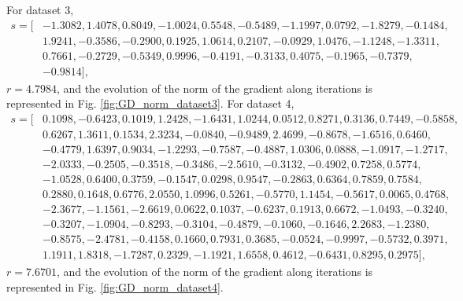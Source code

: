 \documentclass[12pt]{article}
\begin{document}
For dataset 3,
\begin{align*}
    s = [&-1.3082,1.4078,0.8049,-1.0024,0.5548,-0.5489,-1.1997,0.0792,-1.8279,-0.1484,\\
    &1.9241,-0.3586,-0.2900,0.1925,1.0614,0.2107,-0.0929,1.0476,-1.1248,-1.3311,\\
    &0.7661,-0.2729,-0.5349,0.9996,-0.4191,-0.3133,0.4075,-0.1965,-0.7379,\\
    &-0.9814],
\end{align*}
$r = 4.7984$, and the evolution of the norm of the gradient along iterations is represented in Fig. \ref{fig:GD_norm_dataset3}. For dataset 4,
\begin{align*}
    s = [&0.1098,
   -0.6423,
    0.1019,
    1.2428,
   -1.6431,
    1.0244,
    0.0512,
    0.8271,
    0.3136,
    0.7449,
   -0.5858,\\
    &0.6267,
    1.3611,
    0.1534,
    2.3234,
   -0.0840,
   -0.9489,
    2.4699,
   -0.8678,
   -1.6516,
    0.6460,\\
   &-0.4779,
    1.6397,
    0.9034,
   -1.2293,
   -0.7587,
   -0.4887,
    1.0306,
    0.0888,
   -1.0917,
   -1.2717,\\
   &-2.0333,
   -0.2505,
   -0.3518,
   -0.3486,
   -2.5610,
   -0.3132,
   -0.4902,
    0.7258,
    0.5774,\\
   &-1.0528,
    0.6400,
    0.3759,
   -0.1547,
    0.0298,
    0.9547,
   -0.2863,
    0.6364,
    0.7859,
    0.7584,\\
    &0.2880,
    0.1648,
    0.6776,
    2.0550,
    1.0996,
    0.5261,
   -0.5770,
    1.1454,
   -0.5617,
    0.0065,
    0.4768,\\
   &-2.3677,
   -1.1561,
   -2.6619,
    0.0622,
    0.1037,
   -0.6237,
    0.1913,
    0.6672,
   -1.0493,
   -0.3240,\\
   &-0.3207,
   -1.0904,
   -0.8293,
   -0.3104,
   -0.4879,
   -0.1060,
   -0.1646,
    2.2683,
   -1.2380,\\
   &-0.8575,
   -2.4781,
   -0.4158,
    0.1660,
    0.7931,
    0.3685,
   -0.0524,
   -0.9997,
   -0.5732,
    0.3971,\\
    &1.1911,
    1.8318,
   -1.7287,
    0.2329,
   -1.1921,
    1.6558,
    0.4612,
   -0.6431,
    0.8295,
    0.2975],
\end{align*}
$r = 7.6701$, and the evolution of the norm of the gradient along iterations is represented in Fig. \ref{fig:GD_norm_dataset4}.
\end{document}

